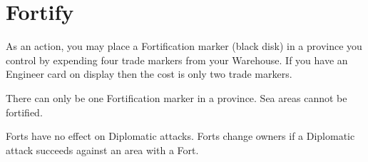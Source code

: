 \section{Fortify}

As an action, you may place a Fortification marker (black disk) in a province you control by expending four trade markers from your Warehouse. If you have an Engineer card on display then the cost is only two trade markers.

There can only be one Fortification marker in a province. Sea areas cannot be fortified.

Forts have no effect on Diplomatic attacks. Forts change owners if a Diplomatic attack succeeds against an area with a Fort.